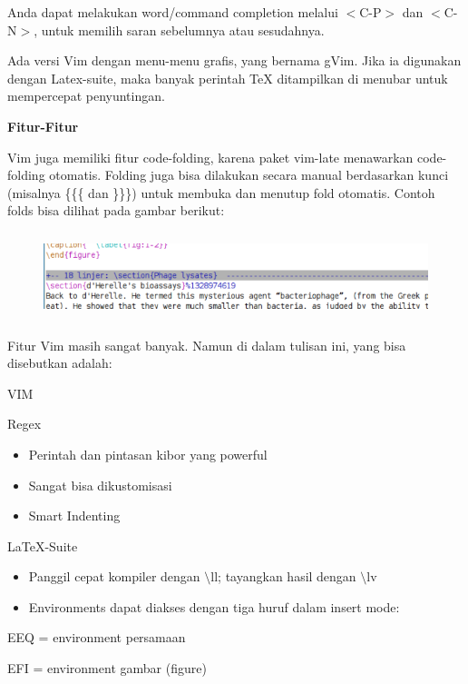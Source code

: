 \begin{enumerate}
Anda dapat melakukan word/command completion melalui $<$C-P$>$ dan $<$C-N$>$, untuk memilih saran sebelumnya atau sesudahnya.
\par \vspace{12pt}
Ada versi Vim dengan menu-menu grafis, yang bernama gVim. Jika ia digunakan dengan Latex-suite, maka banyak perintah TeX ditampilkan di menubar untuk mempercepat penyuntingan.
\par \vspace{12pt}
\textbf{Fitur-Fitur}
\par \vspace{12pt}
Vim juga memiliki fitur code-folding, karena paket vim-late menawarkan code-folding otomatis. Folding juga bisa dilakukan secara manual berdasarkan kunci (misalnya \{\{\{ dan \}\}\}) untuk membuka dan menutup fold otomatis. Contoh folds bisa dilihat pada gambar berikut:

\begin{figure}[ht]

\includegraphics[width=15.12cm,height=2.54cm]{gambar/image5.jpg}
\end{figure}

Fitur Vim masih sangat banyak. Namun di dalam tulisan ini, yang bisa disebutkan adalah:

VIM

Regex

\begin{itemize}
\item Perintah dan pintasan kibor yang powerful
\item Sangat bisa dikustomisasi
\item Smart Indenting
\end{itemize}
LaTeX-Suite

\begin{itemize}
\item Panggil cepat kompiler dengan $\setminus$ll; tayangkan hasil dengan $\setminus$lv
\item Environments dapat diakses dengan tiga huruf dalam insert mode:
\end{itemize}
\hspace{0,2in}EEQ = environment persamaan

EFI = environment gambar (figure)


\end{enumerate}
